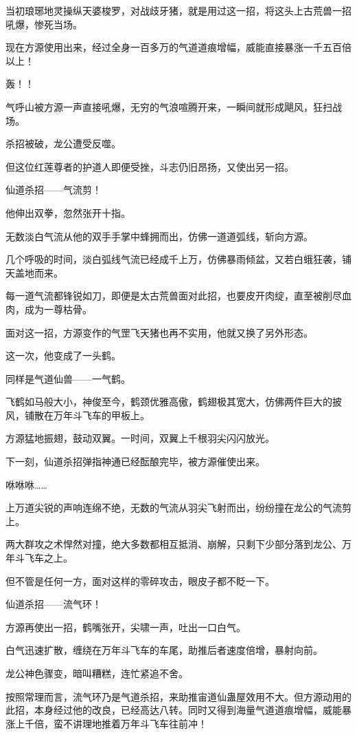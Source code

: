 \begin{this_body}
当初琅琊地灵操纵天婆梭罗，对战歧牙猪，就是用过这一招，将这头上古荒兽一招吼爆，惨死当场。

现在方源使用出来，经过全身一百多万的气道道痕增幅，威能直接暴涨一千五百倍以上！

轰！！

气呼山被方源一声直接吼爆，无穷的气浪喧腾开来，一瞬间就形成飓风，狂扫战场。

杀招被破，龙公遭受反噬。

但这位红莲尊者的护道人即便受挫，斗志仍旧昂扬，又使出另一招。

仙道杀招——气流剪！

他伸出双拳，忽然张开十指。

无数淡白气流从他的双手手掌中蜂拥而出，仿佛一道道弧线，斩向方源。

几个呼吸的时间，淡白弧线气流已经成千上万，仿佛暴雨倾盆，又若白蛾狂袭，铺天盖地而来。

每一道气流都锋锐如刀，即便是太古荒兽面对此招，也要皮开肉绽，直至被削尽血肉，成为一尊枯骨。

面对这一招，方源变作的气罡飞天猪也再不实用，他就又换了另外形态。

这一次，他变成了一头鹤。

同样是气道仙兽——一气鹤。

飞鹤如马般大小，神俊至今，鹤颈优雅高傲，鹤翅极其宽大，仿佛两件巨大的披风，铺散在万年斗飞车的甲板上。

方源猛地振翅，鼓动双翼。一时间，双翼上千根羽尖闪闪放光。

下一刻，仙道杀招弹指神通已经酝酿完毕，被方源催使出来。

咻咻咻……

上万道尖锐的声响连绵不绝，无数的气流从羽尖飞射而出，纷纷撞在龙公的气流剪上。

两大群攻之术悍然对撞，绝大多数都相互抵消、崩解，只剩下少部分落到龙公、万年斗飞车之上。

但不管是任何一方，面对这样的零碎攻击，眼皮子都不眨一下。

仙道杀招——流气环！

方源再使出一招，鹤嘴张开，尖啸一声，吐出一口白气。

白气迅速扩散，缠绕在万年斗飞车的车尾，助推后者速度倍增，暴射向前。

龙公神色骤变，暗叫糟糕，连忙紧追不舍。

按照常理而言，流气环乃是气道杀招，来助推宙道仙蛊屋效用不大。但方源动用的此招，本身经过他的改良，已经高达八转。同时又得到海量气道道痕增幅，威能暴涨上千倍，蛮不讲理地推着万年斗飞车往前冲！


\end{this_body}
